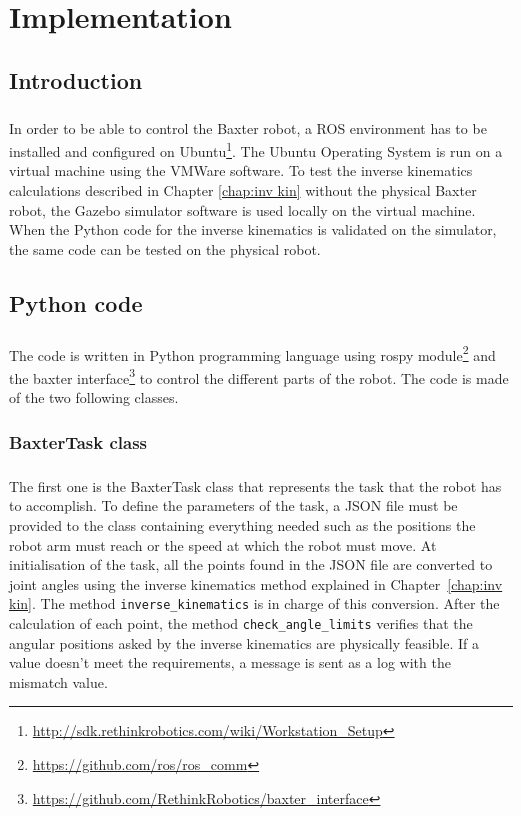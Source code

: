\chapter{Implementation}

\section{Introduction}

\paragraph{}In order to be able to control the Baxter robot, a ROS environment has to be installed and configured on Ubuntu\footnote{\url{http://sdk.rethinkrobotics.com/wiki/Workstation_Setup}}. The Ubuntu Operating System is run on a virtual machine using the VMWare software. To test the inverse kinematics calculations described in Chapter \ref{chap:inv kin} without the physical Baxter robot, the Gazebo simulator software is used locally on the virtual machine. When the Python code for the inverse kinematics is validated on the simulator, the same code can be tested on the physical robot. 

\section{Python code}
\paragraph{}The code is written in Python programming language using rospy module\footnote{\url{https://github.com/ros/ros_comm}} and the baxter interface\footnote{\url{https://github.com/RethinkRobotics/baxter_interface}} to control the different parts of the robot. The code is made of the two following classes. 

\subsection{BaxterTask class}
\paragraph{}The first one is the BaxterTask class that represents the task that the robot has to accomplish. To define the parameters of the task, a JSON file must be provided to the class containing everything needed such as the positions the robot arm must reach or the speed at which the robot must move. At initialisation of the task, all the points found in the JSON file are converted to joint angles using the inverse kinematics method explained in Chapter~\ref{chap:inv kin}. The method \lstinline[language=Python, style=pythonColor]{inverse_kinematics} is in charge of this conversion. After the calculation of each point, the method \lstinline[language=Python, style=pythonColor]{check_angle_limits} verifies that the angular positions asked by the inverse kinematics are physically feasible. If a value doesn't meet the requirements, a message is sent as a log with the mismatch value.

